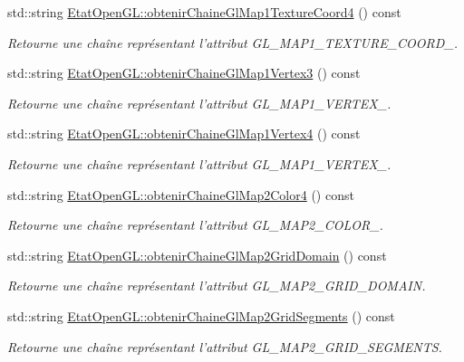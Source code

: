 \begin{DoxyCompactItemize}
std\-::string \hyperlink{group__utilitaire_gab7a65aa462c3a278c42977ed9a35904e}{Etat\-Open\-G\-L\-::obtenir\-Chaine\-Gl\-Map1\-Texture\-Coord4} () const 
\begin{DoxyCompactList}\small\item\em Retourne une chaîne représentant l'attribut G\-L\-\_\-\-M\-A\-P1\-\_\-\-T\-E\-X\-T\-U\-R\-E\-\_\-\-C\-O\-O\-R\-D\-\_. \end{DoxyCompactList}\item 
std\-::string \hyperlink{group__utilitaire_gafe0e07682a0bb42bb227fecd287de609}{Etat\-Open\-G\-L\-::obtenir\-Chaine\-Gl\-Map1\-Vertex3} () const 
\begin{DoxyCompactList}\small\item\em Retourne une chaîne représentant l'attribut G\-L\-\_\-\-M\-A\-P1\-\_\-\-V\-E\-R\-T\-E\-X\-\_. \end{DoxyCompactList}\item 
std\-::string \hyperlink{group__utilitaire_gab130a35770d4594bf74a89d18c49697a}{Etat\-Open\-G\-L\-::obtenir\-Chaine\-Gl\-Map1\-Vertex4} () const 
\begin{DoxyCompactList}\small\item\em Retourne une chaîne représentant l'attribut G\-L\-\_\-\-M\-A\-P1\-\_\-\-V\-E\-R\-T\-E\-X\-\_. \end{DoxyCompactList}\item 
std\-::string \hyperlink{group__utilitaire_ga85dca50f7d25944ca4158173a630d15d}{Etat\-Open\-G\-L\-::obtenir\-Chaine\-Gl\-Map2\-Color4} () const 
\begin{DoxyCompactList}\small\item\em Retourne une chaîne représentant l'attribut G\-L\-\_\-\-M\-A\-P2\-\_\-\-C\-O\-L\-O\-R\-\_. \end{DoxyCompactList}\item 
std\-::string \hyperlink{group__utilitaire_ga15f308a3995cd63e0bf8ff13fd1024dd}{Etat\-Open\-G\-L\-::obtenir\-Chaine\-Gl\-Map2\-Grid\-Domain} () const 
\begin{DoxyCompactList}\small\item\em Retourne une chaîne représentant l'attribut G\-L\-\_\-\-M\-A\-P2\-\_\-\-G\-R\-I\-D\-\_\-\-D\-O\-M\-A\-I\-N. \end{DoxyCompactList}\item 
std\-::string \hyperlink{group__utilitaire_ga7cc72b6b6d1f670c6bb2a37bb02f22cc}{Etat\-Open\-G\-L\-::obtenir\-Chaine\-Gl\-Map2\-Grid\-Segments} () const 
\begin{DoxyCompactList}\small\item\em Retourne une chaîne représentant l'attribut G\-L\-\_\-\-M\-A\-P2\-\_\-\-G\-R\-I\-D\-\_\-\-S\-E\-G\-M\-E\-N\-T\-S. \end{DoxyCompactList}\item 

\end{DoxyCompactItemize}
